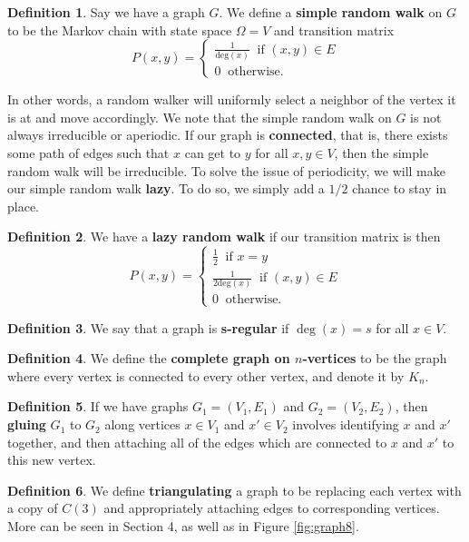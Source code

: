 \documentclass[10pt,a4paper]{amsart}
\theoremstyle{definition}
\newtheorem{definition}{Definition}
\numberwithin{definition}{section}
\begin{document}
\begin{definition}
Say we have a graph $G$. We define a \textbf{simple random walk} on $G$ to be the Markov chain with state space $\Omega = V$ and transition matrix 
\[ P(x,y) = \begin{cases} \frac{1}{\text{deg}(x)} \ \text{ if } (x,y) \in E \\
0 \ \text{ otherwise.}
\end{cases}\]
\end{definition}
In other words, a random walker will uniformly select a neighbor of the vertex it is at and move accordingly. We note that the simple random walk on $G$ is not always irreducible or aperiodic. If our graph is \textbf{connected}, that is, there exists some path of edges such that $x$ can get to $y$ for all $x,y \in V$, then the simple random walk will be irreducible. To solve the issue of periodicity, we will make our simple random walk \textbf{lazy}. To do so, we simply add a $1/2$ chance to stay in place. 

\begin{definition}
We have a \textbf{lazy random walk} if our transition matrix is then 
\[ P(x,y) = \begin{cases} \frac{1}{2} \ \text{ if } x = y \\ 
\frac{1}{2\text{deg}(x)} \ \text{ if } (x,y) \in E \\
0 \ \text{ otherwise.}\end{cases} \]
\end{definition}

\begin{definition}
We say that a graph is \textbf{s-regular} if $\deg(x) = s$ for all $x \in V$. 
\end{definition}

\begin{definition}
We define the \textbf{complete graph on $n$-vertices} to be the graph where every vertex is connected to every other vertex, and denote it by $K_n$.  
\end{definition}

\begin{definition}
If we have graphs $G_1 = (V_1, E_1)$ and $G_2 = (V_2, E_2)$, then \textbf{gluing} $G_1$ to $G_2$ along vertices $x \in V_1$ and $x' \in V_2$ involves identifying $x$ and $x'$ together, and then attaching all of the edges which are connected to $x$ and $x'$ to this new vertex. 
\end{definition}

\begin{definition}
We define \textbf{triangulating} a graph to be replacing each vertex with a copy of $C(3)$ and appropriately attaching edges to corresponding vertices. More can be seen in Section 4, as well as in Figure \ref{fig:graph8}. 
\end{definition}
\end{document}
